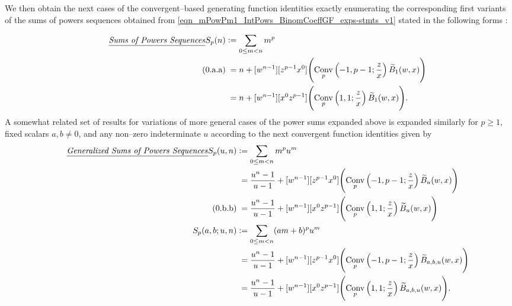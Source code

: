 \documentclass[12pt,reqno]{article}
\renewenvironment{subequations}{%
  \refstepcounter{equation}%
  \edef\theparentequation{\theequation}%
  \setcounter{parentequation}{\value{equation}}%
  \setcounter{equation}{0}%
  \def\theequation{\theparentequation.\alph{equation}}%
  \ignorespaces
}{%
  \setcounter{equation}{\value{parentequation}}%
  \ignorespacesafterend
}
\numberwithin{sfootnote}{section}
\numberwithin{equation}{section}
\newcommand{\tagonce}[0]{
     \addtocounter{equation}{1}
     \tag{\theequation}
}
\newcommand{\tagtext}[1]{\tag*{\underline{\textit{#1}}}}
\theoremstyle{plain}
\theoremstyle{definition}
\theoremstyle{remark}
\newcommand{\defequals}{\ensuremath{\vcentcolon=}}
\newcommand{\StartGroupingSubEquations}{\begin{subequations}}
\newcommand{\EndGroupingSubEquations}{\end{subequations}}
\newcommand{\ConvGF}[4]{\ensuremath{\Conv_{#1}\left(#2, #3; #4\right)}}
\DeclareMathOperator{\Conv}{Conv}
\begin{document}
We then obtain the next cases of the 
convergent--based generating function identities exactly 
enumerating the corresponding first variants of the 
sums of powers sequences obtained from 
\eqref{eqn_mPowPm1_IntPows_BinomCoeffGF_exps-stmts_v1} 
stated in the following forms \citep[\S 6.5, \S 7.6]{GKP}: 
\StartGroupingSubEquations 
\label{eqn_defs_and_ConvFnExps_of_the_GenSUmsOfPowersSeqs} 
\begin{align*} 
\tagtext{Sums of Powers Sequences} 
S_p(n) & \defequals 
     \sum_{0 \leq m < n} m^{p} \\ 
\tagonce\label{eqn_Spn_Conv_and_BNumGF_ident_ex-stmt_v1} 
     & \phantom{:} = 
     n + 
     [w^{n-1}] [z^{p-1} x^0] \Biggl( 
     \ConvGF{p}{-1}{p-1}{\frac{z}{x}} \widetilde{B}_1(w, x) 
     \Biggr) \\ 
     & \phantom{:} = 
     n + 
     [w^{n-1}] [x^0 z^{p-1}] \Biggl( 
     \ConvGF{p}{1}{1}{\frac{z}{x}} \widetilde{B}_1(w, x) 
     \Biggr). 
\end{align*} 
A somewhat related set of results for 
variations of more general cases of the 
power sums expanded above is expanded similarly 
for $p \geq 1$, fixed scalars $a,b \neq 0$, and 
any non--zero indeterminate $u$ according to the 
next convergent function identities given by 
\begin{align*} 
\tagtext{Generalized Sums of Powers Sequences} 
S_{p}(u, n) & \defequals 
     \sum_{0 \leq m < n} m^{p} u^{m} \\ 
     & \phantom{:} = 
     \frac{u^{n} - 1}{u-1} + 
     [w^{n-1}] [z^{p-1} x^{0}] \Biggl( 
     \ConvGF{p}{-1}{p-1}{\frac{z}{x}} 
     \widetilde{B}_u(w, x)
     \Biggr) \\ 
\tagonce\label{eqn_Spn_Conv_and_BNumGF_ident_ex-stmt_v2} 
     & \phantom{:} = 
     \frac{u^{n} - 1}{u-1} + 
     [w^{n-1}] [x^0 z^{p-1}] \Biggl( 
     \ConvGF{p}{1}{1}{\frac{z}{x}} 
     \widetilde{B}_u(w, x)
     \Biggr) \\ 
S_{p}(a, b; u, n) & \defequals 
     \sum_{0 \leq m < n} (am+b)^{p} u^{m} \\ 
     & \phantom{:} = 
     \frac{u^{n} - 1}{u-1} + 
     [w^{n-1}] [z^{p-1} x^{0}] \Biggl( 
     \ConvGF{p}{-1}{p-1}{\frac{z}{x}} 
     \widetilde{B}_{a,b,u}(w, x)
     \Biggr) \\ 
     & \phantom{:} = 
     \frac{u^{n} - 1}{u-1} + 
     [w^{n-1}] [x^0 z^{p-1}] \Biggl( 
     \ConvGF{p}{1}{1}{\frac{z}{x}} 
     \widetilde{B}_{a,b,u}(w, x)
     \Biggr). 
\end{align*} 
\EndGroupingSubEquations 
\end{document}
